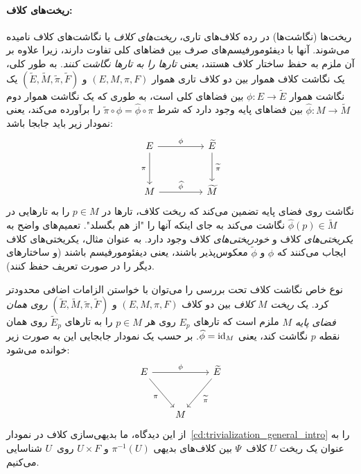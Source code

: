 \paragraph{ریخت‌های کلاف:}

ریخت‌ها (نگاشت‌ها) در رده کلاف‌های تاری، \emph{ریخت‌های کلاف} یا نگاشت‌های کلاف نامیده می‌شوند.
آنها با دیفئومورفیسم‌های صرف بین فضاهای کلی تفاوت دارند، زیرا علاوه بر آن ملزم به حفظ ساختار کلاف هستند، یعنی \emph{تارها را به تارها نگاشت کنند}.
به طور کلی، یک نگاشت کلاف هموار بین دو کلاف تاری هموار $(E,M,\pi,F)$ و $(\widetilde{E},\widetilde{M},\widetilde{\pi},\widetilde{F})$ یک نگاشت هموار $\phi: E \to \widetilde{E}$ بین فضاهای کلی است، به طوری که یک نگاشت هموار دوم $\widehat{\phi}: M \to \widetilde{M}$ بین فضاهای پایه وجود دارد که شرط $\widetilde{\pi} \circ \phi = \widehat{\phi} \circ \pi$ را برآورده می‌کند، یعنی نمودار زیر باید جابجا باشد:
\begin{equation}\label{cd:general_bundle_morphism}
\begin{tikzcd}[row sep=3.em, column sep=4.5em]
	E
			\arrow[r, "\phi"]
			\arrow[d, "\pi\,"']
	& \widetilde{E}
			\arrow[d, "\,\widetilde{\pi}"]
	\\
	M
			\arrow[r, "\widehat{\phi}"]
	& \widetilde{M}
\end{tikzcd}
\end{equation}
نگاشت روی فضای پایه تضمین می‌کند که ریخت کلاف، تارها در $p\in M$ را به تارهایی در $\widehat{\phi}(p) \in \widetilde{M}$ نگاشت می‌کند به جای اینکه آنها را "از هم بگسلد".
تعمیم‌های واضح به \emph{یکریختی‌های} کلاف و \emph{خودریختی‌های} کلاف وجود دارد.
به عنوان مثال، یکریختی‌های کلاف ایجاب می‌کنند که $\phi$ و $\widetilde{\phi}$ معکوس‌پذیر باشند، یعنی دیفئومورفیسم باشند (و ساختارهای دیگر را در صورت تعریف حفظ کنند).


نوع خاص نگاشت کلاف تحت بررسی را می‌توان با خواستن الزامات اضافی محدودتر کرد.
یک \emph{ریخت $M$ کلاف} بین دو کلاف $(E,M,\pi,F)$ و $(\widetilde{E},\widetilde{M},\widetilde{\pi},\widetilde{F})$ \emph{روی همان فضای پایه $M$} ملزم است که تارهای $E_p$ روی هر $p \in M$ را به تارهای $\widetilde{E}_p$ روی همان نقطه $p$ نگاشت کند، یعنی $\widehat{\phi} = \mathrm{id}_M$.
بر حسب یک نمودار جابجایی این به صورت زیر خوانده می‌شود:
\begin{equation}\label{cd:bundle_M_morphism}
\begin{tikzcd}[row sep=3.em, column sep=2em]
	E
			\arrow[rr, "\phi"]
			\arrow[dr, "\pi\,"']
	& & \widetilde{E}
			\arrow[dl, "\,\widetilde{\pi}"]
	\\
	& M
\end{tikzcd}
\end{equation}
از این دیدگاه، ما بدیهی‌سازی کلاف در نمودار~\eqref{cd:trivialization_general_intro} را به عنوان یک ریخت $U$ کلاف~$\Psi$ بین کلاف‌های بدیهی $\pi^{-1}(U)$ و $U\times F$ روی~$U$ شناسایی می‌کنیم.

